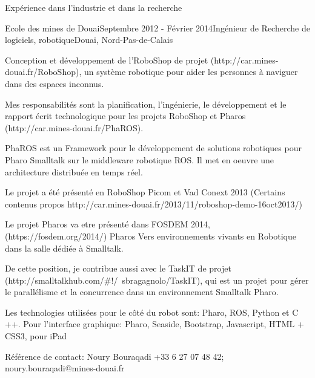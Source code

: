 \documentclass{resume} %
\begin{document}
\begin{rSection}{Exp\'{e}rience dans l'industrie et dans la recherche}
\begin{rSubsection}{Ecole des mines de Douai}{Septembre 2012 - F\'{e}vrier 2014}{Ing\'{e}nieur de Recherche de logiciels, robotique}{Douai, Nord-Pas-de-Calais}
	\item Conception et d\'{e}veloppement de l'RoboShop de projet (http://car.mines-douai.fr/RoboShop), un syst\`{e}me robotique pour aider les personnes \`{a} naviguer dans des espaces inconnus.
	\item Mes responsabilit\'{e}s sont la planification, l'ing\'{e}nierie, le d\'{e}veloppement et le rapport \'{e}crit technologique pour les projets RoboShop et Pharos (http://car.mines-douai.fr/PhaROS).
	\item PhaROS est un Framework pour le d\'{e}veloppement de solutions robotiques pour Pharo Smalltalk sur le middleware robotique ROS. Il met en oeuvre une architecture distribu\'{e}e en temps r\'{e}el.
	\item Le projet a \'{e}t\'{e} pr\'{e}sent\'{e} en RoboShop Picom et Vad Conext 2013 (Certains contenus propos http://car.mines-douai.fr/2013/11/roboshop-demo-16oct2013/)
	\item Le projet Pharos va etre pr\'{e}sent\'{e} dans FOSDEM 2014, (https://fosdem.org/2014/) Pharos Vers environnements vivants en Robotique dans la salle d\'{e}di\'{e}e \`{a} Smalltalk.
	\item De cette position, je contribue aussi avec le TaskIT de projet (http://smalltalkhub.com/\#!/~sbragagnolo/TaskIT), qui est un projet pour g\'{e}rer le parall\'{e}lisme et la concurrence dans un environnement Smalltalk Pharo.
	\item Les technologies utilis\'{e}es pour le côt\'{e} du robot sont: Pharo, ROS, Python et C ++. Pour l'interface graphique: Pharo, Seaside, Bootstrap, Javascript, HTML + CSS3, pour iPad
		\item R\'{e}f\'{e}rence de contact: Noury Bouraqadi +33 6 27 07 48 42; noury.bouraqadi@mines-douai.fr
\end{rSubsection}




\end{rSection}
\end{document}
